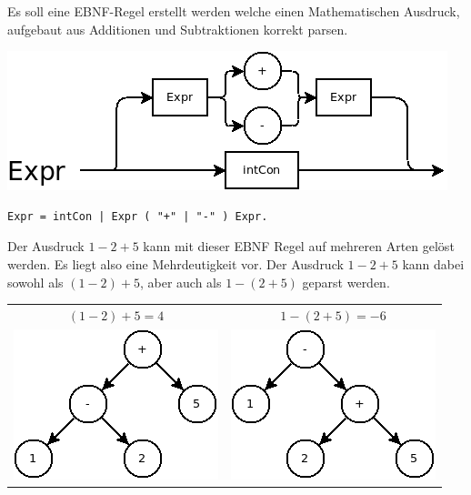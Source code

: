 
Es soll eine EBNF-Regel erstellt werden welche einen Mathematischen Ausdruck, aufgebaut aus Additionen und Subtraktionen korrekt parsen.


\includegraphics[scale=0.5]{./media/images/compiler/ambiguity_wrong.png}

\begin{lstlisting}[language=EBNF]
Expr = intCon | Expr ( "+" | "-" ) Expr.
\end{lstlisting}

Der Ausdruck $1-2+5$ kann mit dieser EBNF Regel auf mehreren Arten gelöst werden. Es liegt also eine Mehrdeutigkeit vor. Der Ausdruck $1-2+5$ kann dabei sowohl als $(1-2)+5$, aber auch als $1-(2+5)$ geparst werden.

\begin{tabular}{ c | c }
  $(1-2)+5=4$ & 
  $1-(2+5)=-6$ \\
  \includegraphics[scale=0.5]{./media/images/compiler/ambiguity_tree_correct.png} & 
  \includegraphics[scale=0.5]{./media/images/compiler/ambiguity_tree_wrong.png} \\
\end{tabular}

